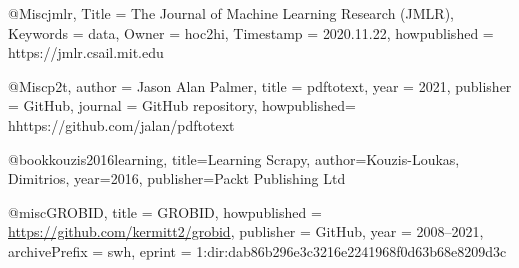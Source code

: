 @Misc{jmlr,
  Title                    = {The Journal of Machine Learning Research (JMLR)},
  Keywords                 = {data},
  Owner                    = {hoc2hi},
  Timestamp                = {2020.11.22},
  howpublished                      = {https://jmlr.csail.mit.edu}
}

@Misc{p2t,
  author = {Jason Alan Palmer},
  title = {pdftotext},
  year = {2021},
  publisher = {GitHub},
  journal = {GitHub repository},
  howpublished= {hhttps://github.com/jalan/pdftotext}
}

@book{kouzis2016learning,
  title={Learning Scrapy},
  author={Kouzis-Loukas, Dimitrios},
  year={2016},
  publisher={Packt Publishing Ltd}
}

@misc{GROBID,
    title = {GROBID},
    howpublished = {\url{https://github.com/kermitt2/grobid}},
    publisher = {GitHub},
    year = {2008--2021},
    archivePrefix = {swh},
    eprint = {1:dir:dab86b296e3c3216e2241968f0d63b68e8209d3c}
}
